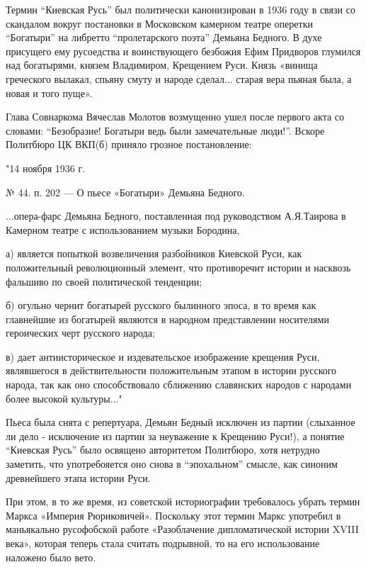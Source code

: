 Термин \enquote{Киевская Русь} был политически канонизирован в 1936 году в связи со
скандалом вокруг постановки в Московском камерном театре оперетки \enquote{Богатыри} на
либретто \enquote{пролетарского поэта} Демьяна Бедного. В духе присущего ему русоедства
и воинствующего безбожия Ефим Придворов глумился над богатырями, князем
Владимиром, Крещением Руси. Князь «винища греческого вылакал, спьяну смуту и
народе сделал... старая вера пьяная была, а новая и того пуще».

Глава Совнаркома Вячеслав Молотов возмущенно ушел после первого акта со
словами: \enquote{Безобразие! Богатыри ведь были замечательные люди!}. Вскоре Политбюро
ЦК ВКП(б) приняло грозное постановление:

\begin{zzquote}
"14 ноября 1936 г.

№ 44. п. 202 — О пьесе «Богатыри» Демьяна Бедного.

...опера-фарс Демьяна Бедного, поставленная под руководством А.Я.Таирова в
Камерном театре с использованием музыки Бородина,

а) является попыткой возвеличения разбойников Киевской Руси, как положительный
революционный элемент, что противоречит истории и насквозь фальшиво по своей
политической тенденции;

б) огульно чернит богатырей русского былинного эпоса, в то время как главнейшие
из богатырей являются в народном представлении носителями героических черт
русского народа;

в) дает антиисторическое и издевательское изображение крещения Руси,
являвшегося в действительности положительным этапом в истории русского народа,
так как оно способствовало сближению славянских народов с народами более
высокой культуры..."	
\end{zzquote}


Пьеса была снята с репертуара, Демьян Бедный исключен из партии (слыханное ли
дело - исключение из партии за неуважение к Крещению Руси!), а понятие
\enquote{Киевская Русь} было освящено авторитетом Политбюро, хотя нетрудно заметить,
что употребояется оно снова в \enquote{эпохальном} смысле, как синоним древнейшего
этапа истории Руси. 

При этом, в то же время, из советской историографии требовалось убрать термин
Маркса «Империя Рюриковичей». Поскольку этот термин Маркс употребил в
маньякально русофобской работе «Разоблачение дипломатической истории XVIII
века», которая теперь стала считать подрывной, то на его использование наложено
было вето.


